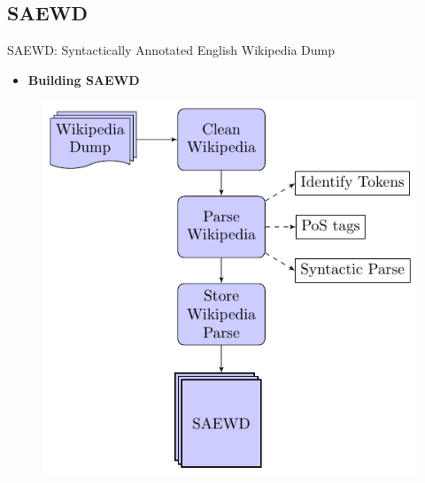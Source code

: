 \subsection{SAEWD}
\begin{frame}{SAEWD: Syntactically Annotated English Wikipedia Dump}

\begin{itemize}
	\item[] \textbf{Building SAEWD}
\end{itemize}

\begin{figure}
\centering
\includegraphics[width=0.5\linewidth]{img/saewd_flow_chart}
\end{figure}

\end{frame}

